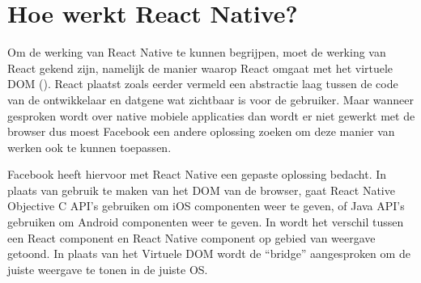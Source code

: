 \section{Hoe werkt React Native?}
Om de werking van React Native te kunnen begrijpen, moet de werking van React gekend zijn, namelijk de manier waarop React omgaat met het virtuele DOM (). React plaatst zoals eerder vermeld een abstractie laag tussen de code van de ontwikkelaar en datgene wat zichtbaar is voor de gebruiker. Maar wanneer gesproken wordt over native mobiele applicaties dan wordt er niet gewerkt met de browser dus moest Facebook een andere oplossing zoeken om deze manier van werken ook te kunnen toepassen. 

Facebook heeft hiervoor met React Native een gepaste oplossing bedacht. In plaats van gebruik te maken van het DOM van de browser, gaat React Native Objective C API’s gebruiken om iOS componenten weer te geven, of Java API’s gebruiken om Android componenten weer te geven.  In  wordt het verschil tussen een React component en React Native component op gebied van weergave getoond. In plaats van het Virtuele DOM wordt de “bridge” aangesproken om de juiste weergave te tonen in de juiste OS.  

